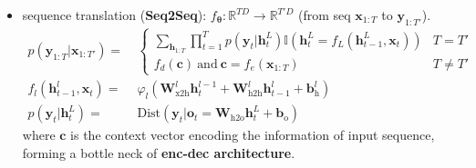 \begin{itemize}
    \item sequence translation (\textbf{Seq2Seq}): $f_{\bm{\theta}}:\mathbb{R}^{TD}\to\mathbb{R}^{T'D}$ (from seq $\bm{x}_{1:T}$ to $\bm{y}_{1:T'}$).
    \begin{align}
        p(\bm{y}_{1:T}|\bm{x}_{1:T'})=&~\begin{cases}
            \sum_{\bm{h}_{1:T}}\prod_{t=1}^T p(\bm{y}_t|\bm{h}_t^L)\mathbb{I}(\bm{h}_t^L 
            = f_L(\bm{h}_{t-1}^L,\bm{x}_t)) & T=T' \\
            f_d(\bm{c})~\text{and}~\bm{c}
            = f_e(\bm{x}_{1:T}) & T \neq T'
        \end{cases} \\
        f_l(\bm{h}_{t-1}^l,\bm{x}_t)
        =&~ \varphi_l(\mathbf{W}_\text{x2h}^l\bm{h}_t^{l-1} + \mathbf{W}_\text{h2h}^l\bm{h}_{t-1}^l + \bm{b}_\text{h}^l) \label{eq:seq2seqh} \\
        p(\bm{y}_t|\bm{h}_t^L)
        =&~ \mathrm{Dist}(\bm{y}_t|\bm{o}_t = \mathbf{W}_\text{h2o}\bm{h}_t^L + \bm{b}_\text{o})
    \end{align}
    where $\bm{c}$ is the context vector encoding the information of input sequence, 
    forming a bottle neck of \textbf{enc-dec architecture}.
\end{itemize}

